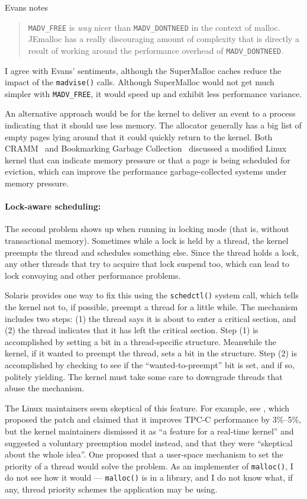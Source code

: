\documentclass[natbib,sort&compress,10pt]{sigplanconf}
\newcommand{\code}[1]{\texttt{#1}}
\begin{document}
Evans notes \cite{Evans12}
\begin{quote}
 \code{MADV\_FREE} is \textit{way} nicer than \code{MADV\_DONTNEED} in
 the context of malloc.  JEmalloc has a really discouraging amount of
 complexity that is directly a result of working around the
 performance overhead of \code{MADV\_DONTNEED}.
\end{quote}
I agree with Evans' sentiments, although the SuperMalloc caches reduce
the impact of the \code{madvise()} calls.  Although SuperMalloc would
not get much simpler with \code{MADV\_FREE}, it would speed up and
exhibit less performance variance.

An alternative approach would be for the kernel to deliver an event to
a process indicating that it should use less memory.  The allocator
generally has a big list of empty pages lying around that it could
quickly return to the kernel.  Both CRAMM~\cite{YangBeKa06} and
Bookmarking Garbage Collection~\cite{HertzFeBe05} discussed a
modified Linux kernel that can indicate memory pressure or that a page
is being scheduled for eviction, which can improve the performance
garbage-collected systems under memory pressure.

{\paragraph{Lock-aware scheduling:}} The second problem shows up when
running in locking mode (that is, without transactional
memory).  Sometimes while a lock is held by a thread, the kernel
preempts the thread and schedules something else.  Since the thread
holds a lock, any other threads that try to acquire that lock suspend
too, which can lead to lock convoying and other performance problems.

Solaris provides one way to fix this using the \code{schedctl()}
system call, which tells the kernel not to, if possible, preempt a
thread for a little while\cite{Dice11}.  The mechanism includes two
steps: (1) the thread says it is about to enter a critical section,
and (2) the thread indicates that it has left the critical section.
Step (1) is accomplished by setting a bit in a thread-specific
structure.  Meanwhile the kernel, if it wanted to preempt the thread,
sets a bit in the structure.  Step (2) is accomplished by checking to
see if the ``wanted-to-preempt'' bit is set, and if so, politely
yielding.  The kernel must take some care to downgrade threads that
abuse the mechanism.

The Linux maintainers seem skeptical of this feature.  For example,
see \cite{Aziz14}, which proposed the patch and claimed that it
improves TPC-C performance by 3\%--5\%, but the kernel maintainers
dismissed it as ``a feature for a real-time kernel'' and suggested a
voluntary preemption model instead, and that they were ``skeptical
about the whole idea''.  One proposed \cite{Oboguev14a, Oboguev14b}
that a user-space mechanism to set the priority of a thread would solve
the problem.  As an implementer of \code{malloc()}, I do not see how it
would --- \code{malloc()} is in a library, and I do not know what, if
any, thread priority schemes the application may be using.
\end{document}
